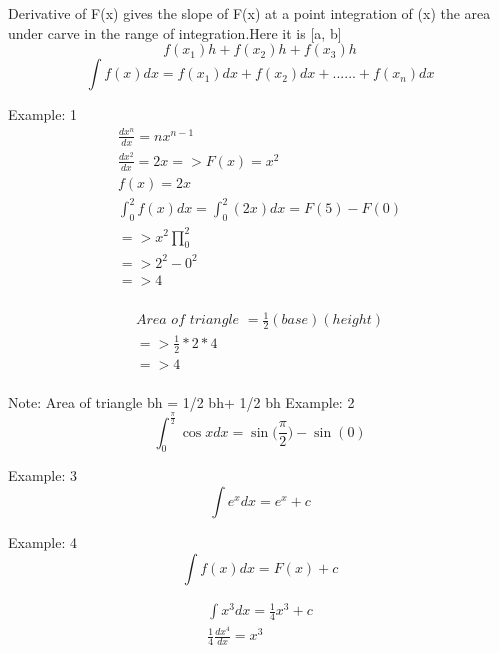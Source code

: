 	Derivative of F(x) gives the slope of F(x) at a point integration of (x) the area under carve in the range of integration.Here it is [a, b]
\newline
\begin{equation}
	f(x_1)h+f(x_2)h+f(x_3)h
\end{equation}
\begin{equation}
	\int f(x)dx=f(x_1)dx+f(x_2)dx+......+f(x_n)dx
\end{equation}

Example: 1
\begin{align}
	\frac{dx^n}{dx} = nx^{n-1} \\
	\frac{dx^2}{dx} = 2x => F(x)=x^2 \\
	f(x) = 2x \\
	\int_{0}^{2}f(x)dx=\int_{0}^{2}(2x)dx = F(5)-F(0) \\
	=> x^2\prod_{0}^{2} \\
	=>2^2-0^2 \\
	=>4 \\
\end{align}

\begin{align}
	Area \,\, of \,\, triangle\,\, = \frac{1}{2}(base)(height) \\
	=>\frac{1}{2}*2*4 \\
	=> 4 \\
\end{align}

Note: Area of triangle bh = 1/2 bh+ 1/2 bh
\newline
Example: 2
\begin{equation}
	\int_{0}^{\frac{\pi}{2}}\cos xdx = \sin\big(\frac{\pi}{2}\big) - \sin(0)
\end{equation}

Example: 3
\begin{equation}
	\int e^x dx = e^x+c
\end{equation}

Example: 4
\begin{equation}
	\int f(x)dx=F(x)+c
\end{equation}

\begin{align}
	\int x^3 dx = \frac{1}{4}x^3+c \\
	\frac{1}{4}\frac{dx^4}{dx} = x^3 \\	
\end{align}







